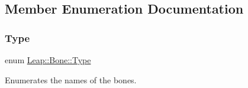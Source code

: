 \subsection{Member Enumeration Documentation}
\mbox{\label{class_leap_1_1_bone_ac2f949e05b22edc21a308df42580b5e1}} 
\subsubsection{\texorpdfstring{Type}{Type}}
{\footnotesize\ttfamily enum \hyperlink{class_leap_1_1_bone_ac2f949e05b22edc21a308df42580b5e1}{Leap\+::\+Bone\+::\+Type}}

Enumerates the names of the bones.

